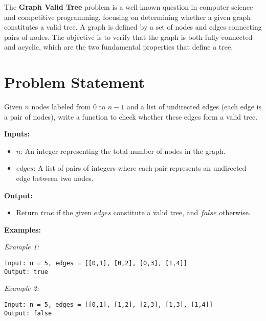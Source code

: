 
\label{problem:graph_valid_tree}

The \textbf{Graph Valid Tree} problem is a well-known question in computer science and competitive programming, focusing on determining whether a given graph constitutes a valid tree. A graph is defined by a set of nodes and edges connecting pairs of nodes. The objective is to verify that the graph is both fully connected and acyclic, which are the two fundamental properties that define a tree.

\section*{Problem Statement}

Given \( n \) nodes labeled from \( 0 \) to \( n-1 \) and a list of undirected edges (each edge is a pair of nodes), write a function to check whether these edges form a valid tree.

\textbf{Inputs:}
\begin{itemize}
    \item \( n \): An integer representing the total number of nodes in the graph.
    \item \( edges \): A list of pairs of integers where each pair represents an undirected edge between two nodes.
\end{itemize}

\textbf{Output:}
\begin{itemize}
    \item Return \( true \) if the given \( edges \) constitute a valid tree, and \( false \) otherwise.
\end{itemize}

\textbf{Examples:}

\textit{Example 1:}
\begin{verbatim}
Input: n = 5, edges = [[0,1], [0,2], [0,3], [1,4]]
Output: true
\end{verbatim}

\textit{Example 2:}
\begin{verbatim}
Input: n = 5, edges = [[0,1], [1,2], [2,3], [1,3], [1,4]]
Output: false
\end{verbatim}


